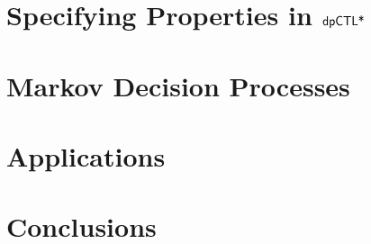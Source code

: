 \documentclass{llncs}
\begin{document}
\section{Specifying Properties in $\textsf{dpCTL*}$}
\label{section:specifying-properties}


\section{Markov Decision Processes}
\label{section:mdp}


%


\section{Applications}
\label{section:applications}


\section{Conclusions}
\label{section:conclusions}




\end{document}

